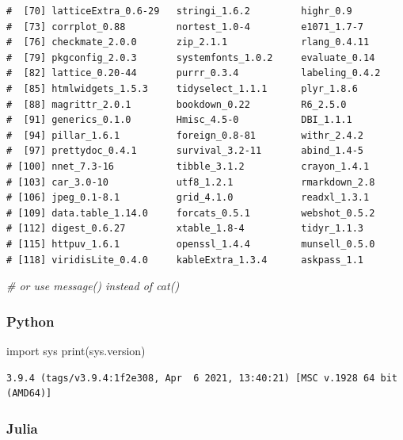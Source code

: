 \documentclass[
  12pt,
]{article}
\newenvironment{Shaded}{\begin{snugshade}}{\end{snugshade}}
\newcommand{\BuiltInTok}[1]{#1}
\newcommand{\CommentTok}[1]{\textcolor[rgb]{0.56,0.35,0.01}{\textit{#1}}}
\newcommand{\ImportTok}[1]{#1}
\newcommand{\NormalTok}[1]{#1}
\begin{document}
\begin{verbatim}
#  [70] latticeExtra_0.6-29   stringi_1.6.2         highr_0.9             
#  [73] corrplot_0.88         nortest_1.0-4         e1071_1.7-7           
#  [76] checkmate_2.0.0       zip_2.1.1             rlang_0.4.11          
#  [79] pkgconfig_2.0.3       systemfonts_1.0.2     evaluate_0.14         
#  [82] lattice_0.20-44       purrr_0.3.4           labeling_0.4.2        
#  [85] htmlwidgets_1.5.3     tidyselect_1.1.1      plyr_1.8.6            
#  [88] magrittr_2.0.1        bookdown_0.22         R6_2.5.0              
#  [91] generics_0.1.0        Hmisc_4.5-0           DBI_1.1.1             
#  [94] pillar_1.6.1          foreign_0.8-81        withr_2.4.2           
#  [97] prettydoc_0.4.1       survival_3.2-11       abind_1.4-5           
# [100] nnet_7.3-16           tibble_3.1.2          crayon_1.4.1          
# [103] car_3.0-10            utf8_1.2.1            rmarkdown_2.8         
# [106] jpeg_0.1-8.1          grid_4.1.0            readxl_1.3.1          
# [109] data.table_1.14.0     forcats_0.5.1         webshot_0.5.2         
# [112] digest_0.6.27         xtable_1.8-4          tidyr_1.1.3           
# [115] httpuv_1.6.1          openssl_1.4.4         munsell_0.5.0         
# [118] viridisLite_0.4.0     kableExtra_1.3.4      askpass_1.1           
\end{verbatim}

\begin{Shaded}
\begin{Highlighting}[]
  \CommentTok{\# or use message() instead of cat()}
\end{Highlighting}
\end{Shaded}

\hypertarget{python-1}{%
\subsubsection{Python}\label{python-1}}

\begin{Shaded}
\begin{Highlighting}[]
\ImportTok{import}\NormalTok{ sys}
\BuiltInTok{print}\NormalTok{(sys.version)}
\end{Highlighting}
\end{Shaded}

\begin{verbatim}
3.9.4 (tags/v3.9.4:1f2e308, Apr  6 2021, 13:40:21) [MSC v.1928 64 bit (AMD64)]
\end{verbatim}

\hypertarget{julia}{%
\subsubsection{Julia}\label{julia}}
\end{document}
